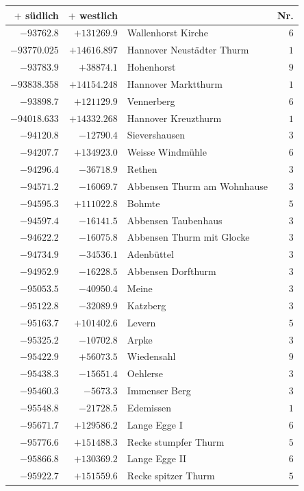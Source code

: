 \begin{center}\begingroup\fontsize{8}{9}\selectfont
\setlength{\tabcolsep}{4pt}
\begin{tabular}{r|r|p{170pt}|r}\hline
\(+\) südlich&\(+\) westlich&&Nr.\\\hline
\(-93762.8\)&\(+131269.9\)&Wallenhorst Kirche&\(6\)\\
\(-93770.025\)&\(+14616.897\)&Hannover Neustädter Thurm&\(1\)\\
\(-93783.9\)&\(+38874.1\)&Hohenhorst&\(9\)\\
\(-93838.358\)&\(+14154.248\)&Hannover Marktthurm&\(1\)\\
\(-93898.7\)&\(+121129.9\)&Vennerberg&\(6\)\\
\(-94018.633\)&\(+14332.268\)&Hannover Kreuzthurm&\(1\)\\
\(-94120.8\)&\(-12790.4\)&Sievershausen&\(3\)\\
\(-94207.7\)&\(+134923.0\)&Weisse Windmühle&\(6\)\\
\(-94296.4\)&\(-36718.9\)&Rethen&\(3\)\\
\(-94571.2\)&\(-16069.7\)&Abbensen Thurm am Wohnhause&\(3\)\\
\(-94595.3\)&\(+111022.8\)&Bohmte&\(5\)\\
\(-94597.4\)&\(-16141.5\)&Abbensen Taubenhaus&\(3\)\\
\(-94622.2\)&\(-16075.8\)&Abbensen Thurm mit Glocke&\(3\)\\
\(-94734.9\)&\(-34536.1\)&Adenbüttel&\(3\)\\
\(-94952.9\)&\(-16228.5\)&Abbensen Dorfthurm&\(3\)\\
\(-95053.5\)&\(-40950.4\)&Meine&\(3\)\\
\(-95122.8\)&\(-32089.9\)&Katzberg&\(3\)\\
\(-95163.7\)&\(+101402.6\)&Levern&\(5\)\\
\(-95325.2\)&\(-10702.8\)&Arpke&\(3\)\\
\(-95422.9\)&\(+56073.5\)&Wiedensahl&\(9\)\\
\(-95438.3\)&\(-15651.4\)&Oehlerse&\(3\)\\
\(-95460.3\)&\(-5673.3\)&Immenser Berg&\(3\)\\
\(-95548.8\)&\(-21728.5\)&Edemissen&\(1\)\\
\(-95671.7\)&\(+129586.2\)&Lange Egge I&\(6\)\\
\(-95776.6\)&\(+151488.3\)&Recke stumpfer Thurm&\(5\)\\
\(-95866.8\)&\(+130369.2\)&Lange Egge II&\(6\)\\
\(-95922.7\)&\(+151559.6\)&Recke spitzer Thurm&\(5\)\\

\end{tabular}
\end{center}
